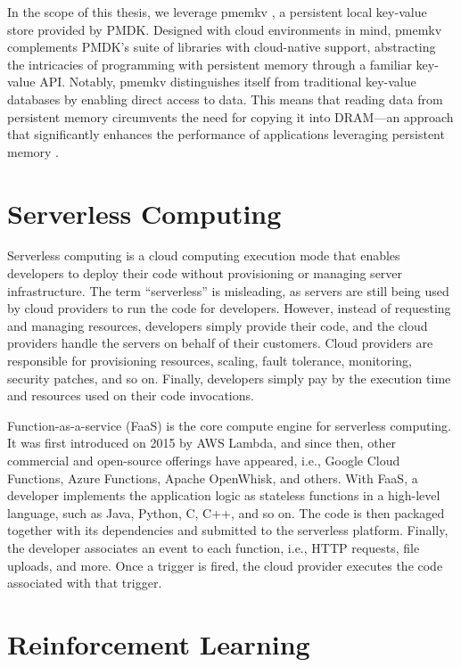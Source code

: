 In the scope of this thesis, we leverage pmemkv \cite{GitHubpm66:online}, a persistent local key-value store provided by PMDK. Designed with cloud environments in mind, pmemkv complements PMDK's suite of libraries with cloud-native support, abstracting the intricacies of programming with persistent memory through a familiar key-value API. Notably, pmemkv distinguishes itself from traditional key-value databases by enabling direct access to data. This means that reading data from persistent memory circumvents the need for copying it into DRAM—an approach that significantly enhances the performance of applications leveraging persistent memory \cite{scargall2020pmem}.

\section{Serverless Computing}

Serverless computing is a cloud computing execution mode that enables developers to deploy their code without provisioning or managing server infrastructure. The term “serverless” is misleading, as servers are still being used by cloud providers to run the code for developers. However, instead of requesting and managing resources, developers simply provide their code, and the cloud providers handle the servers on behalf of their customers. Cloud providers are responsible for provisioning resources, scaling, fault tolerance, monitoring, security patches, and so on. Finally, developers simply pay by the execution time and resources used on their code invocations.

Function-as-a-service (FaaS) is the core compute engine for serverless computing. It was first introduced on 2015 by AWS Lambda, and since then, other commercial and open-source offerings have appeared, i.e., Google Cloud Functions, Azure Functions, Apache OpenWhisk, and others. With FaaS, a developer implements the application logic as stateless functions in a high-level language, such as Java, Python, C, C++, and so on. The code is then packaged together with its dependencies and submitted to the serverless platform. Finally, the developer associates an event to each function, i.e., HTTP requests, file uploads, and more. Once a trigger is fired, the cloud provider executes the code associated with that trigger.

\section{Reinforcement Learning}

